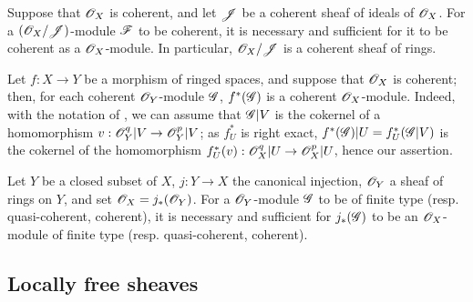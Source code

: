 \begin{env}[5.3.10]
\label{0.5.3.10}
Suppose that $\mathscr{O}_X$ is coherent, and let $\mathscr{J}$ be a coherent sheaf of ideals of $\mathscr{O}_X$.
For a $(\mathscr{O}_X/\mathscr{J})$-module $\mathscr{F}$ to be coherent, it is necessary and sufficient for it to be coherent as a $\mathscr{O}_X$-module.
In particular, $\mathscr{O}_X/\mathscr{J}$ is a coherent sheaf of rings.
\end{env}

\begin{env}[5.3.11]
\label{0.5.3.11}
Let $f:X\to Y$ be a morphism of ringed spaces, and suppose that $\mathscr{O}_X$ is coherent;
then, for each coherent $\mathscr{O}_Y$-module $\mathscr{G}$, $f^*(\mathscr{G})$ is a coherent $\mathscr{O}_X$-module.
Indeed, with the notation of , we can assume that $\mathscr{G}|V$ is the cokernel of a homomorphism $v:\sh{O}_Y^q|V\to\sh{O}_Y^p|V$;
as $f_U^*$ is right exact, $f^*(\mathscr{G})|U=f_U^*(\mathscr{G}|V)$ is the cokernel of the homomorphism $f_U^*(v):\sh{O}_X^q|U\to\sh{O}_X^p|U$, hence our assertion.
\end{env}

\begin{env}[5.3.12]
\label{0.5.3.12}
Let $Y$ be a closed subset of $X$, $j:Y\to X$ the canonical injection, $\mathscr{O}_Y$ a sheaf of rings on $Y$, and set $\mathscr{O}_X=j_*(\mathscr{O}_Y)$.
For a $\mathscr{O}_Y$-module $\mathscr{G}$ to be of finite type (resp. quasi-coherent, coherent), it is necessary and sufficient for $j_*(\mathscr{G})$ to be an $\mathscr{O}_X$-module of finite type (resp. quasi-coherent, coherent).
\end{env}

\subsection{Locally free sheaves}
\label{subsection:0.5.4}

